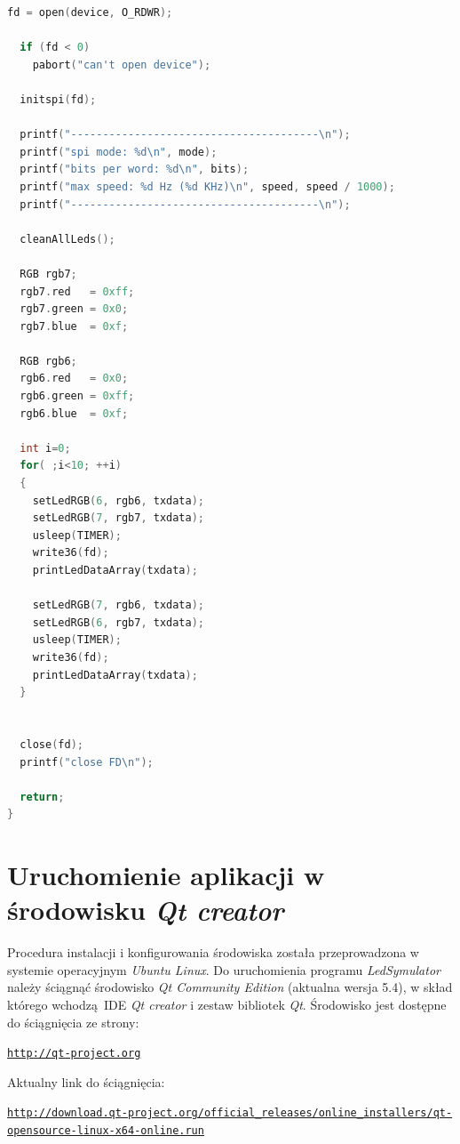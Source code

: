 \documentclass[eng,printmode]{mgr}
\begin{document}
\begin{lstlisting}[language=c,frame=single,caption={Sterowanie układem emph{tlc5947} za pomocą biblioteki   \emph{tlc5947\_controller}}]
  fd = open(device, O_RDWR);

  if (fd < 0)
    pabort("can't open device");

  initspi(fd);

  printf("---------------------------------------\n");
  printf("spi mode: %d\n", mode);
  printf("bits per word: %d\n", bits);
  printf("max speed: %d Hz (%d KHz)\n", speed, speed / 1000);
  printf("---------------------------------------\n");

  cleanAllLeds();

  RGB rgb7;
  rgb7.red   = 0xff;
  rgb7.green = 0x0;
  rgb7.blue  = 0xf; 

  RGB rgb6;
  rgb6.red   = 0x0;
  rgb6.green = 0xff;
  rgb6.blue  = 0xf; 
  
  int i=0;
  for( ;i<10; ++i)
  {
    setLedRGB(6, rgb6, txdata);
    setLedRGB(7, rgb7, txdata); 
    usleep(TIMER);
    write36(fd);
    printLedDataArray(txdata);

    setLedRGB(7, rgb6, txdata);
    setLedRGB(6, rgb7, txdata); 
    usleep(TIMER);
    write36(fd);
    printLedDataArray(txdata);
  }


  close(fd);
  printf("close FD\n");

  return;
}
\end{lstlisting}

\clearpage
\section{Uruchomienie aplikacji w środowisku \emph{Qt creator}}
Procedura instalacji i konfigurowania środowiska została przeprowadzona w systemie operacyjnym \emph{Ubuntu Linux}.
Do uruchomienia programu \emph{LedSymulator} należy ściągnąć środowisko \emph{Qt Community Edition} (aktualna wersja 5.4), w skład którego wchodzą IDE \emph{Qt creator} i zestaw bibliotek \emph{Qt}.
Środowisko jest dostępne do ściągnięcia ze strony:

\begin{alltt}
    \url{http://qt-project.org}
\end{alltt}

Aktualny link do ściągnięcia:

\begin{alltt}
    \url{http://download.qt-project.org/official_releases/online_installers/qt-opensource-linux-x64-online.run}
\end{alltt}
\end{document}

